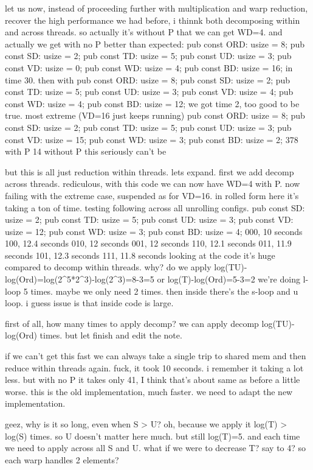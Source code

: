 let us now, instead of proceeding further with multiplication and warp reduction, recover the high performance we had before, i thinnk both decomposing within and across threads.
so actually it's without P that we can get WD=4. and actually we get with no P better than expected: 
pub const ORD: usize = 8;
pub const SD: usize = 2;
pub const TD: usize = 5;
pub const UD: usize = 3;
pub const VD: usize = 0;
pub const WD: usize = 4;
pub const BD: usize = 16;
in time 30.
then with 
pub const ORD: usize = 8;
pub const SD: usize = 2;
pub const TD: usize = 5;
pub const UD: usize = 3;
pub const VD: usize = 4;
pub const WD: usize = 4;
pub const BD: usize = 12;
we got time 2, too good to be true. 
most extreme (VD=16 just keeps running)
pub const ORD: usize = 8;
pub const SD: usize = 2;
pub const TD: usize = 5;
pub const UD: usize = 3;
pub const VD: usize = 15;
pub const WD: usize = 3;
pub const BD: usize = 2;
378 with P
14 without P
this seriously can't be

but this is all just reduction within threads.
lets expand. 
first we add decomp across threads.
rediculous, with this code we can now have WD=4 with P.
now failing with the extreme case, suspended as for VD=16.
in rolled form here it's taking a ton of time. testing following across all unrolling configs.
pub const SD: usize = 2;
pub const TD: usize = 5;
pub const UD: usize = 3;
pub const VD: usize = 12;
pub const WD: usize = 3;
pub const BD: usize = 4;
000, 10 seconds
100, 12.4 seconds
010, 12 seconds
001, 12 seconds
110, 12.1 seconds
011, 11.9 seconds
101, 12.3 seconds
111, 11.8 seconds
looking at the code it's huge compared to decomp within threads. why? 
do we apply log(TU)-log(Ord)=log(2^5*2^3)-log(2^3)=8-3=5 or log(T)-log(Ord)=5-3=2
we're doing l-loop 5 times. maybe we only need 2 times.
then inside there's the s-loop and u loop. i guess issue is that inside code is large.

first of all, how many times to apply decomp?
we can apply decomp log(TU)-log(Ord) times. but 
let finish and edit the note.

if we can't get this fast we can always take a single trip to shared mem and then reduce within threads again. 
fuck, it took 10 seconds. i remember it taking a lot less.
but with no P it takes only 41, I think that's about same as before a little worse. this is the old implementation, much faster. we need to adapt the new implementation. 

geez, why is it so long, even when S > U?
oh, because we apply it log(T) > log(S) times. so U doesn't matter here much. 
but still log(T)=5. and each time we need to apply across all S and U. 
what if we were to decrease T? say to 4? so each warp handles 2 elements?

